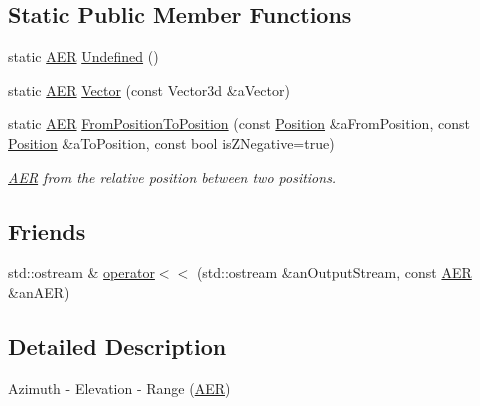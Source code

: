 \subsection*{Static Public Member Functions}
\begin{DoxyCompactItemize}
\item 
static \hyperlink{classlibrary_1_1physics_1_1coord_1_1spherical_1_1_a_e_r}{A\+ER} \hyperlink{classlibrary_1_1physics_1_1coord_1_1spherical_1_1_a_e_r_a53936583d6117c9515f8646b7d1cb897}{Undefined} ()
\item 
static \hyperlink{classlibrary_1_1physics_1_1coord_1_1spherical_1_1_a_e_r}{A\+ER} \hyperlink{classlibrary_1_1physics_1_1coord_1_1spherical_1_1_a_e_r_ad17b64ba28594943d96ca882333eec24}{Vector} (const Vector3d \&a\+Vector)
\item 
static \hyperlink{classlibrary_1_1physics_1_1coord_1_1spherical_1_1_a_e_r}{A\+ER} \hyperlink{classlibrary_1_1physics_1_1coord_1_1spherical_1_1_a_e_r_ad0d42198f5d6c6790c2c659ded982d33}{From\+Position\+To\+Position} (const \hyperlink{classlibrary_1_1physics_1_1coord_1_1_position}{Position} \&a\+From\+Position, const \hyperlink{classlibrary_1_1physics_1_1coord_1_1_position}{Position} \&a\+To\+Position, const bool is\+Z\+Negative=true)
\begin{DoxyCompactList}\small\item\em \hyperlink{classlibrary_1_1physics_1_1coord_1_1spherical_1_1_a_e_r}{A\+ER} from the relative position between two positions. \end{DoxyCompactList}\end{DoxyCompactItemize}
\subsection*{Friends}
\begin{DoxyCompactItemize}
\item 
std\+::ostream \& \hyperlink{classlibrary_1_1physics_1_1coord_1_1spherical_1_1_a_e_r_ac5514fc65bf0bd3f4f5870b246cff3ad}{operator$<$$<$} (std\+::ostream \&an\+Output\+Stream, const \hyperlink{classlibrary_1_1physics_1_1coord_1_1spherical_1_1_a_e_r}{A\+ER} \&an\+A\+ER)
\end{DoxyCompactItemize}


\subsection{Detailed Description}
Azimuth -\/ Elevation -\/ Range (\hyperlink{classlibrary_1_1physics_1_1coord_1_1spherical_1_1_a_e_r}{A\+ER}) 

